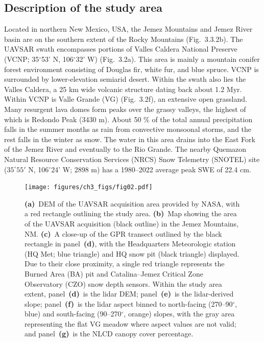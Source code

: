 \hypertarget{ch3-methods-3}{\subsection{Description of the study area}\label{ch3-methods-3}}


Located in northern New Mexico, USA, the Jemez Mountains and Jemez River basin are on the southern extent of the Rocky Mountains (Fig.~3.3.2b). The UAVSAR swath encompasses portions of Valles Caldera National Preserve (VCNP; 35$^{\circ}$53' N, 106$^{\circ}$32' W) (Fig.~3.2a). This area is mainly a mountain conifer forest environment consisting of Douglas fir, white fur, and blue spruce. VCNP is surrounded by lower-elevation semiarid desert. Within the swath also lies the Valles Caldera, a 25 km wide volcanic structure dating back about 1.2 Myr. Within VCNP is Valle Grande (VG) (Fig.~3.2f), an extensive open grassland. Many resurgent lava domes form peaks over the grassy valleys, the highest of which is Redondo Peak (3430 m). About 50 \% of the total annual precipitation falls in the summer months as rain from convective monsoonal storms, and the rest falls in the winter as snow. The water in this area drains into the East Fork of the Jemez River and eventually to the Rio Grande. The nearby Quemazon Natural Resource Conservation Services (NRCS) Snow Telemetry (SNOTEL) site ($35^{\circ}55'$ N, 106$^{\circ}$24' W; 2898 m) has a 1980--2022 average peak SWE of 22.4 cm.

\begin{figure}[t]
\centering\texttt{[image: figures/ch3\_figs/fig02.pdf]}
\caption{\textbf{(a)}~DEM of the UAVSAR acquisition area provided by NASA, with a red rectangle outlining the study area. \textbf{(b)}~Map showing the area of the UAVSAR acquisition (black outline) in the Jemez Mountains, NM. \textbf{(c)}~A close-up of the GPR transect outlined by the black rectangle in panel~\textbf{(d)}, with the Headquarters Meteorologic station (HQ Met; blue triangle) and HQ snow pit (black triangle) displayed. Due to their close proximity, a single red triangle represents the Burned Area (BA) pit and Catalina--Jemez Critical Zone Observatory (CZO) snow depth sensors. Within the study area extent, panel~\textbf{(d)}~is the lidar DEM; panel~\textbf{(e)}~is the lidar-derived slope; panel~\textbf{(f)}~is the lidar aspect binned to north-facing (270--90$^{\circ}$, blue) and south-facing (90--270$^{\circ}$, orange) slopes, with the gray area representing the flat VG meadow where aspect values are not valid; and panel~\textbf{(g)}~is the NLCD canopy cover percentage.}
\end{figure}
\clearpage

